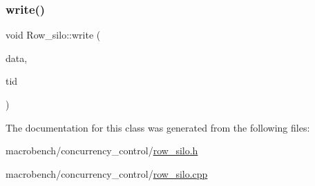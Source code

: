 \mbox{\label{classRow__silo_a7dfe1a018b98e8c8f32c763e3f1c033e}} 
\subsubsection{\texorpdfstring{write()}{write()}}
{\footnotesize\ttfamily void Row\+\_\+silo\+::write (\begin{DoxyParamCaption}\item[{\hyperlink{classrow__t}{row\+\_\+t} $\ast$}]{data,  }\item[{uint64\+\_\+t}]{tid }\end{DoxyParamCaption})}



The documentation for this class was generated from the following files\+:\begin{DoxyCompactItemize}
\item 
macrobench/concurrency\+\_\+control/\hyperlink{row__silo_8h}{row\+\_\+silo.\+h}\item 
macrobench/concurrency\+\_\+control/\hyperlink{row__silo_8cpp}{row\+\_\+silo.\+cpp}\end{DoxyCompactItemize}
